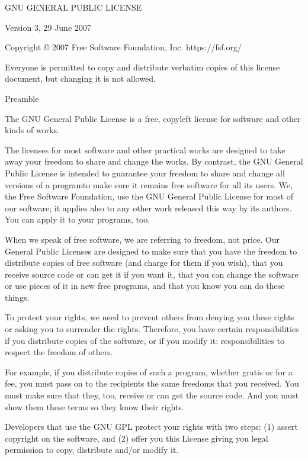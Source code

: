 \documentclass[letterpaper,10pt,english]{sphinxmanual}
\begin{document}
\begin{sphinxVerbatim}[commandchars=\\\{\}]
 GNU GENERAL PUBLIC LICENSE

 Version 3, 29 June 2007

 Copyright © 2007 Free Software Foundation, Inc. \PYGZlt{}https://fsf.org/\PYGZgt{}

 Everyone is permitted to copy and distribute verbatim copies of this license
 document, but changing it is not allowed.

 Preamble

   The GNU General Public License is a free, copyleft license for software and
   other kinds of works.

   The licenses for most software and other practical works are designed to
   take away your freedom to share and change the works. By contrast, the GNU
   General Public License is intended to guarantee your freedom to share and
   change all versions of a program\PYGZhy{}\PYGZhy{}to make sure it remains free software for
   all its users. We, the Free Software Foundation, use the GNU General Public
   License for most of our software; it applies also to any other work released
   this way by its authors. You can apply it to your programs, too.

   When we speak of free software, we are referring to freedom, not price. Our
   General Public Licenses are designed to make sure that you have the freedom
   to distribute copies of free software (and charge for them if you wish),
   that you receive source code or can get it if you want it, that you can
   change the software or use pieces of it in new free programs, and that you
   know you can do these things.

   To protect your rights, we need to prevent others from denying you these
   rights or asking you to surrender the rights. Therefore, you have certain
   responsibilities if you distribute copies of the software, or if you modify
   it: responsibilities to respect the freedom of others.

   For example, if you distribute copies of such a program, whether gratis or
   for a fee, you must pass on to the recipients the same freedoms that you
   received. You must make sure that they, too, receive or can get the source
   code. And you must show them these terms so they know their rights.

   Developers that use the GNU GPL protect your rights with two steps: (1)
   assert copyright on the software, and (2) offer you this License giving you
   legal permission to copy, distribute and/or modify it.


\end{sphinxVerbatim}
\end{document}
